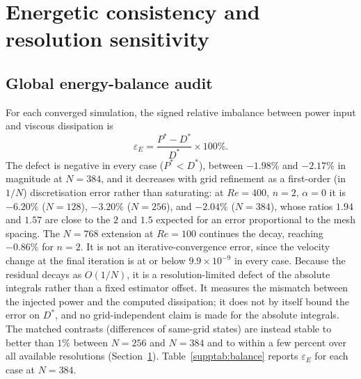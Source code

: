 \section{Energetic consistency and resolution sensitivity}
\label{suppsec:consistency}

\subsection{Global energy-balance audit}

For each converged simulation, the signed relative imbalance between power input and viscous dissipation is
\begin{equation}
\varepsilon_E = \frac{P^*-D^*}{D^*}\times 100\%.
\end{equation}
The defect is negative in every case ($P^*<D^*$), between $-1.98\%$ and $-2.17\%$ in magnitude at $N=384$, and it decreases with grid refinement as a first-order (in $1/N$) discretisation error rather than saturating: at $Re=400$, $n=2$, $\alpha=0$ it is $-6.20\%$ ($N=128$), $-3.20\%$ ($N=256$), and $-2.04\%$ ($N=384$), whose ratios $1.94$ and $1.57$ are close to the $2$ and $1.5$ expected for an error proportional to the mesh spacing. The $N=768$ extension at $Re=100$ continues the decay, reaching $-0.86\%$ for $n=2$. It is not an iterative-convergence error, since the velocity change at the final iteration is at or below $9.9\times10^{-9}$ in every case. Because the residual decays as $O(1/N)$, it is a resolution-limited defect of the absolute integrals rather than a fixed estimator offset. It measures the mismatch between the injected power and the computed dissipation; it does not by itself bound the error on $D^*$, and no grid-independent claim is made for the absolute integrals. The matched contrasts (differences of same-grid states) are instead stable to better than $1\%$ between $N=256$ and $N=384$ and to within a few percent over all available resolutions (Section~\ref{suppsec:consistency}). Table~\ref{supptab:balance} reports $\varepsilon_E$ for each case at $N=384$.

